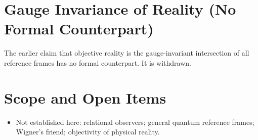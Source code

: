 \documentclass[11pt, a4paper]{article}
\begin{document}
\section{Gauge Invariance of Reality (No Formal Counterpart)}
The earlier claim that objective reality is the gauge-invariant intersection of all reference frames has no formal counterpart. It is withdrawn.

\section{Scope and Open Items}
\begin{itemize}
  \item Not established here: relational observers; general quantum reference frames; Wigner's friend; objectivity of physical reality.
\end{itemize}
\end{document}
